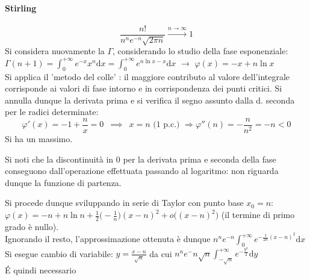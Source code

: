 \documentclass[10pt]{article}
\theoremstyle{plain}
\begin{document}
\paragraph{Stirling}
\[\frac{n!}{n^n e^{-n} \sqrt{2\pi n}} \xrightarrow[]{n \rightarrow \infty} 1\]
Si considera nuovamente la $\Gamma$, considerando lo studio della fase esponenziale: $\displaystyle \Gamma(n+1) = \int_0^{+\infty} e^{-x} x^{n} \textrm{d}x = \int_0^{+\infty} e^{n \ln x - x} \textrm{d}x$ $\rightarrow$ $\varphi(x) = - x + n \ln x$
\\Si applica il 'metodo del colle' : il maggiore contributo al valore dell'integrale corrisponde ai valori di fase intorno e in corrispondenza dei punti critici. Si annulla dunque la derivata prima e si verifica il segno assunto dalla d. seconda per le radici determinate:
\[\varphi'(x) = -1 + \frac{n}{x} = 0 \enspace \implies \enspace x = n \textrm{ (1 p.c.) } \Rightarrow \varphi''(n) = - \frac{n}{n^2} = - n < 0\]
Si ha un massimo.
\begin{oss}
    Si noti che la discontinuità in $0$ per la derivata prima e seconda della fase conseguono dall'operazione effettuata passando al logaritmo: non riguarda dunque la funzione di partenza.
\end{oss}
Si procede dunque sviluppando in serie di Taylor con punto base $x_0 = n$: $\displaystyle \varphi(x) = - n + n \ln n + \frac{1}{2}\big(-\frac{1}{n}\big)(x-n)^2 + o\big((x-n)^2\big)$ (il termine di primo grado è nullo).
\\Ignorando il resto, l'approssimazione ottenuta è dunque $\displaystyle n^n e^{-n} \int_0^{+\infty} e^{\displaystyle -\frac{1}{2n}(x-n)^2}\textrm{d}x$
\\Si esegue cambio di variabile: $\displaystyle y = \frac{x-n}{\sqrt{n}}$ da cui $\displaystyle n^n e^-n \sqrt{n} \int_{-\sqrt{n}}^{+\infty} e^{\displaystyle-\frac{y^2}{2}}\textrm{d}y$
\\\'E quindi necessario
\end{document}
